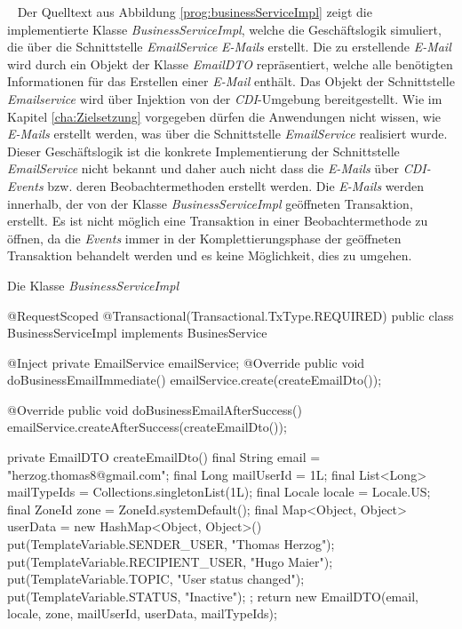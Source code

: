 \ \newline
Der Quelltext aus Abbildung \ref{prog:businessServiceImpl} zeigt die implementierte Klasse \emph{BusinessServiceImpl}, welche die Geschäftslogik simuliert, die über die Schnittstelle \emph{EmailService} \emph{E-Mails} erstellt. Die zu erstellende \emph{E-Mail} wird durch ein Objekt der Klasse \emph{EmailDTO} repräsentiert, welche alle benötigten Informationen für das Erstellen einer \emph{E-Mail} enthält. Das Objekt der Schnittstelle \emph{Emailservice} wird über Injektion von der \emph{CDI}-Umgebung bereitgestellt. Wie im Kapitel \ref{cha:Zielsetzung} vorgegeben dürfen die Anwendungen nicht wissen, wie \emph{E-Mails} erstellt werden, was über die Schnittstelle \emph{EmailService} realisiert wurde. Dieser Geschäftslogik ist die konkrete Implementierung der Schnittstelle \emph{EmailService} nicht bekannt und daher auch nicht dass die \emph{E-Mails} über \emph{CDI-Events} bzw. deren Beobachtermethoden erstellt werden.
\newline
\newline
Die \emph{E-Mails} werden innerhalb, der von der Klasse \emph{BusinessServiceImpl} geöffneten Transaktion, erstellt. Es ist nicht möglich eine Transaktion in einer Beobachtermethode zu öffnen, da die \emph{Events} immer in der Komplettierungsphase der geöffneten Transaktion behandelt werden und es keine Möglichkeit, dies zu umgehen.
\newpage
\begin{program}[h]
\caption{Die Klasse \emph{BusinessServiceImpl}}
\label{prog:businessServiceImpl}
\begin{JavaCode}
@RequestScoped
@Transactional(Transactional.TxType.REQUIRED)
public class BusinessServiceImpl implements BusinesService {
    @Inject
    private EmailService emailService;
    @Override
    public void doBusinessEmailImmediate() {
        emailService.create(createEmailDto());
    }

    @Override
    public void doBusinessEmailAfterSuccess() {
        emailService.createAfterSuccess(createEmailDto());
    }

    private EmailDTO createEmailDto() {
        final String email = "herzog.thomas8@gmail.com";
        final Long mailUserId = 1L;
        final List<Long> mailTypeIds = Collections.singletonList(1L);
        final Locale locale = Locale.US;
        final ZoneId zone = ZoneId.systemDefault();
        final Map<Object, Object> userData = 
        	new HashMap<Object, Object>() {{
                put(TemplateVariable.SENDER_USER, "Thomas Herzog");
                put(TemplateVariable.RECIPIENT_USER, "Hugo Maier");
                put(TemplateVariable.TOPIC, "User status changed");
                put(TemplateVariable.STATUS, "Inactive");
            }};
        return new EmailDTO(email, 
        					locale, 
        					zone, 
        					mailUserId, 
        					userData, 
        					mailTypeIds);
    }
}
\end{JavaCode}
\end{program}
